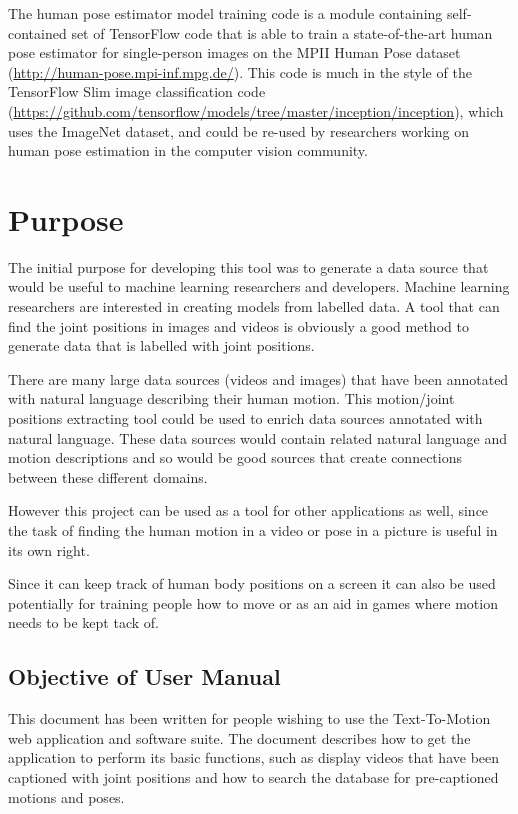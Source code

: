 \documentclass{scrreprt}
\begin{document}
The human pose estimator model training code is a module containing
self-contained set of TensorFlow code that is able to train a state-of-the-art
human pose estimator for single-person images on the MPII Human Pose dataset
(\url{http://human-pose.mpi-inf.mpg.de/}). This code is much in the style of
the TensorFlow Slim image classification code
(\url{https://github.com/tensorflow/models/tree/master/inception/inception}),
which uses the ImageNet dataset, and could be re-used by researchers working on
human pose estimation in the computer vision community.

\section{Purpose}

The initial purpose for developing this tool was to generate a data source that
would be useful to machine learning researchers and developers.  Machine
learning researchers are interested in creating models from labelled data.  A
tool that can find the joint positions in images and videos is obviously a good
method to generate data that is labelled with joint positions.

There are many large data sources (videos and images) that have been annotated
with natural language describing their human motion. This motion/joint positions
extracting tool could be used to enrich data sources annotated with natural
language.  These data sources would contain related natural language  and
motion descriptions and so would be good sources that create connections
between these different domains.

However this project can be used as a tool for other applications as well, since
the task of finding the human motion in a video or pose in a picture is useful
in its own right.

Since it can keep track of human body positions on a screen it can also be used
potentially for training people how to move or as an aid in games where motion
needs to be kept tack of.

\subsection{Objective of User Manual}

This document has been written for people wishing to use the Text-To-Motion web
application and software suite.  The document describes how to get the
application to perform its basic functions, such as display videos that have
been captioned with joint positions and how to search the database for
pre-captioned motions and poses.
\end{document}
